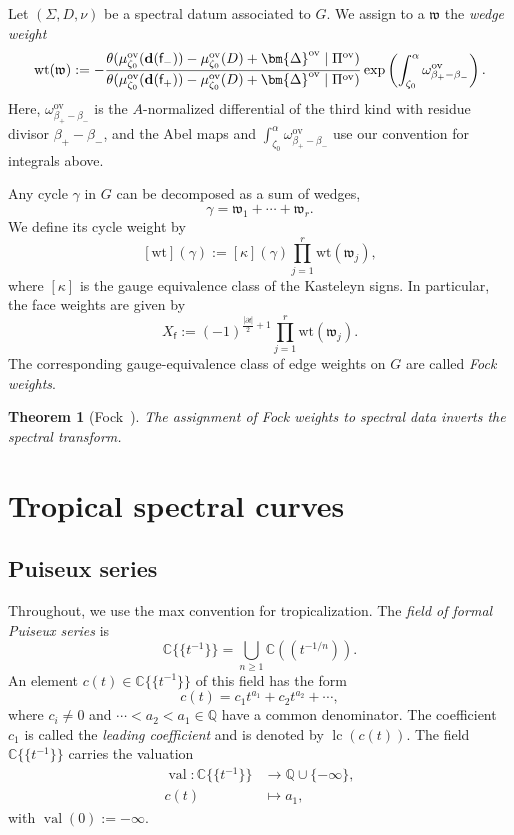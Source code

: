 \documentclass[12pt]{amsart}
\numberwithin{equation}{section}
\newtheorem{theorem}{Theorem}[section]
\theoremstyle{definition}
\newcommand{\C}{\mathbb{C}}
\def\Gtor{G}
\newcommand{\wt}{\mathrm{wt}}
\newcommand{\val}{\operatorname{val}}
\newcommand{\ra}{\rightarrow}
\def\divisor{D}
\def\val{\operatorname{val}}
\def\lc{\operatorname{lc}}
\def\bface{\mathsf{f}}
\def\dam{{\bf d}}
\def\spectralcurve{\Sigma}
\def\divisor{D}
\def\vecRC{\bm{\Delta}}
\def\Q{\mathbb{Q}}
\def\ptSig{\zeta}
\def\basept{{\ptSig_0}}
\begin{document}
Let $(\spectralcurve,\divisor,\nu)$ be a spectral datum associated to $\Gtor$. We assign to a $\mathfrak w$ the \emph{wedge weight}
\begin{equation}
\label{eq:fock:wedge}
\wt(\mathfrak w)
:=
-\frac{
  \theta(\mu_\basept^{\mathrm{ov}}(\dam(\bface_-))-\mu^{\mathrm{ov}}_\basept(\divisor)+\vecRC^{\mathrm{ov}}\mid\Pi^{\mathrm{ov}})
}{
  \theta(\mu_\basept^{\mathrm{ov}}(\dam(\bface_+))-\mu^{\mathrm{ov}}_\basept(\divisor)+\vecRC^{\mathrm{ov}}\mid\Pi^{\mathrm{ov}})
}
\exp\left(
  \int_{\basept}^{\alpha}\omega_{\beta_+-\beta_-}^{\mathrm{ov}}
\right).
\end{equation}
Here, $\omega_{\beta_+-\beta_-}^{\mathrm{ov}}$ is the $A$-normalized differential of the third kind with residue divisor $\beta_+-\beta_-$, and the Abel maps and $
  \int_{\basept}^{\alpha}\omega_{\beta_+-\beta_-}^{\mathrm{ov}}$ use our convention for integrals above. 

Any cycle $\gamma$ in $\Gtor$ can be decomposed as a sum of wedges,
\[
\gamma=\mathfrak w_1+\cdots+\mathfrak w_r.
\] 
We define its cycle weight by 
\[
[\wt](\gamma):= [\kappa](\gamma)
\prod_{j=1}^r\wt(\mathfrak w_j),
\]
where $[\kappa]$ is the gauge equivalence class of the Kasteleyn signs. In particular, the face weights are given by
\[
X_{\bface}
:=
(-1)^{\frac{|\partial\bface|}{2}+1}
\prod_{j=1}^r\wt(\mathfrak w_j).
\]
The corresponding gauge-equivalence class of
edge weights on $G$ are called \emph{Fock weights}.

\begin{theorem}[Fock~\cite{Fock}]\label{thm:fock_inverse}
  The assignment of Fock weights to spectral data inverts the spectral transform.
\end{theorem}


\section{Tropical spectral curves}\label{sec:trp_spec_curve}

\subsection{Puiseux series}

Throughout, we use the max convention for tropicalization. The \emph{field of formal Puiseux series} is
\[
{\mathbb C\{\!\{ t^{-1}\}\!\}}=\bigcup_{n\geq1}\C(\!(t^{-1/n})\!).
\]
An element $c(t) \in {\mathbb C\{\!\{ t^{-1}\}\!\}}$ of this field has the form
\[
c(t)
=
c_1t^{a_1}+c_2t^{a_2}+\cdots,
\]
where $c_i\neq0$ and
$
\cdots<a_2<a_1\in\Q
$
have a common denominator. The coefficient $c_1$ is called the
\emph{leading coefficient} and is denoted by $\lc(c(t))$. The field
${\mathbb C\{\!\{ t^{-1}\}\!\}}$ carries the valuation
\[
\begin{aligned}
\val:{\mathbb C\{\!\{ t^{-1}\}\!\}}&\ra\Q\cup\{-\infty\},\\
c(t)&\mapsto a_1,
\end{aligned}
\]
with $\val(0):=-\infty$.
\end{document}
